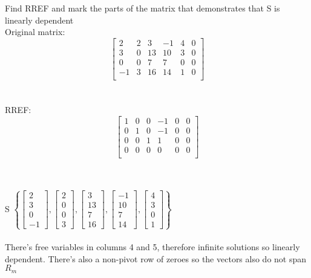 \documentclass{article}
\begin{document}
{Find RREF and mark the parts of the matrix that demonstrates that S is linearly dependent
\\
Original matrix:
$$
\begin{bmatrix} 
2 & 2 & 3 & -1 & 4 & 0 \\ 
3 & 0 & 13 & 10 & 3 & 0\\
0 & 0 & 7 & 7 & 0 & 0 \\
-1 & 3 & 16 & 14 & 1 & 0 \\
\end{bmatrix}
$$\\
\\
RREF:
$$
\begin{bmatrix} 
1 & 0 & 0 & -1 & 0 & 0\\ 
0 & 1 & 0 & -1 & 0 & 0\\
0 & 0 & 1 & 1 & 0 & 0\\
0 & 0 & 0 & 0 & 0 & 0\\
\end{bmatrix}
$$\

\\
S $\left\{
 \left[\begin{matrix} 2 \\ 3 \\ 0 \\ -1 \end{matrix}\right],
 \left[\begin{matrix} 2 \\ 0 \\ 0 \\ 3 \end{matrix}\right],
 \left[\begin{matrix} 3 \\ 13 \\ 7 \\ 16 \end{matrix}\right],
 \left[\begin{matrix} -1 \\ 10 \\ 7 \\ 14 \end{matrix}\right],
 \left[\begin{matrix} 4 \\ 3 \\ 0 \\ 1 \end{matrix}\right]
 \right\}$\\
\\
There's free variables in columns 4 and 5, therefore infinite solutions so linearly dependent. There's also a non-pivot row of zeroes so the vectors also do not span $R_{m}$\\
\\
}
\end{document}
